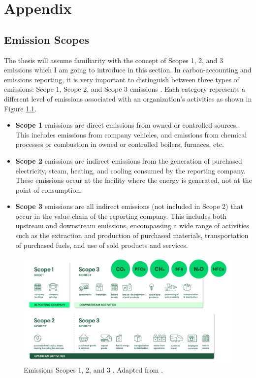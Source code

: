 \chapter{Appendix}
\label{AppendixA}

\section{Emission Scopes}
\label{sec:emission_scopes}
The thesis will assume familiarity with the concept of Scopes 1, 2, and 3 emissions which I am going to introduce in this section. In carbon-accounting and emissions reporting, it is very important to distinguish between three types of emissions: Scope 1, Scope 2, and Scope 3 emissions  \cite{Bernoville2022Scopes}. Each category represents a different level of emissions associated with an organization's activities as shown in Figure \ref{fig:emission_scopes}.

\begin{itemize}
    \item \textbf{Scope 1} emissions are direct emissions from owned or controlled sources. This includes emissions from company vehicles, and emissions from chemical processes or combustion in owned or controlled boilers, furnaces, etc.
    \item \textbf{Scope 2} emissions are indirect emissions from the generation of purchased electricity, steam, heating, and cooling consumed by the reporting company. These emissions occur at the facility where the energy is generated, not at the point of consumption.
    \item \textbf{Scope 3} emissions are all indirect emissions (not included in Scope 2) that occur in the value chain of the reporting company. This includes both upstream and downstream emissions, encompassing a wide range of activities such as the extraction and production of purchased materials, transportation of purchased fuels, and use of sold products and services.
\end{itemize}

\begin{figure}[h]
    \centering
    \includegraphics[width=1\textwidth]{figures/emission_scopes.png}
    \caption{Emissions Scopes 1, 2, and 3 . Adapted from \cite{Bernoville2022Scopes}.}
    \label{fig:emission_scopes}
\end{figure}

